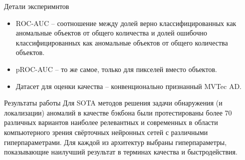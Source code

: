 \documentclass{beamer}
\begin{document}
\begin{frame}{Детали эксперимнтов}
	\begin{itemize}
		\item ROC-AUC -- соотношение между долей верно классифицированных как аномальные объектов от общего количества и долей ошибочно классифицированных как аномальные объектов от общего количества объектов.
		
		\item pROC-AUC -- то же самое, только для пикселей вместо объектов.
		
		\item Датасет для оценки качества -- конвенционально признанный MVTec AD.
	\end{itemize}
\end{frame}

\begin{frame}{Результаты работы}
	Для SOTA методов решения задачи обнаружения (и локализации) аномалий в качестве бэкбона были протестированы более 70 различных вариантов наиболее релевантных и современных в области компьютерного зрения свёрточных нейронных сетей с различными гиперпараметрами. Для каждой из архитектур выбраны гиперпараметры, показывающие наилучший результат в терминах качества и быстродействия.
\end{frame}
	
\end{document}
